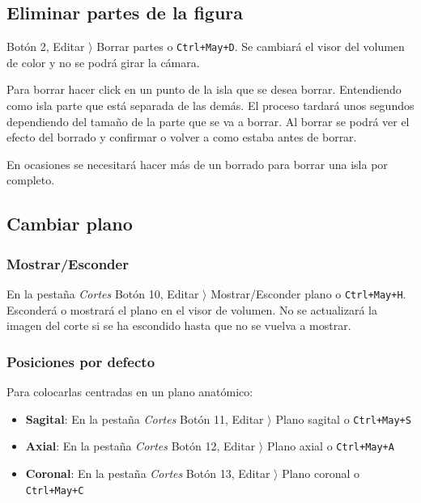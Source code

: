 \subsection{Eliminar partes de la figura}

Botón 2, Editar $ \rangle $ Borrar partes o \texttt{Ctrl+May+D}. Se cambiará el visor del volumen de color y no se podrá girar la cámara.

Para borrar hacer click en un punto de la isla que se desea borrar. Entendiendo como isla parte que está separada de las demás. El proceso tardará unos segundos dependiendo del tamaño de la parte que se va a borrar. Al borrar se podrá ver el efecto del borrado y confirmar o volver a como estaba antes de borrar.

En ocasiones se necesitará hacer más de un borrado para borrar una isla por completo.

\subsection{Cambiar plano}

\subsubsection{Mostrar/Esconder}

En la pestaña \textit{Cortes} Botón 10, Editar $ \rangle $ Mostrar/Esconder plano o \texttt{Ctrl+May+H}. Esconderá o mostrará el plano en el visor de volumen. No se actualizará la imagen del corte si se ha escondido hasta que no se vuelva a mostrar.

\subsubsection{Posiciones por defecto}

Para colocarlas centradas en un plano anatómico:

\begin{itemize}
	\item \textbf{Sagital}: En la pestaña \textit{Cortes} Botón 11, Editar $ \rangle $ Plano sagital o \texttt{Ctrl+May+S}
	\item \textbf{Axial}: En la pestaña \textit{Cortes} Botón 12, Editar $ \rangle $ Plano axial o \texttt{Ctrl+May+A}
	\item \textbf{Coronal}: En la pestaña \textit{Cortes} Botón 13, Editar $ \rangle $ Plano coronal o \texttt{Ctrl+May+C}
\end{itemize}

